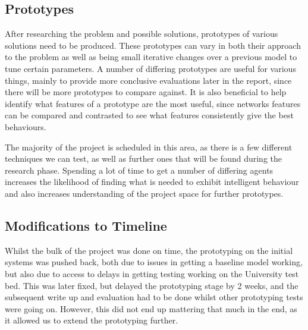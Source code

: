 \subsection{Prototypes}

After researching the problem and possible solutions, prototypes of various
solutions need to be produced. These prototypes can vary in both their approach
to the problem as well as being small iterative changes over a previous model
to tune certain parameters. A number of differing prototypes are useful for
various things, mainly to provide more conclusive evaluations later in the report,
since there will be more prototypes to compare against. It is also beneficial to
help identify what features of a prototype are the most useful, since networks
features can be compared and contrasted to see what features consistently give the
best behaviours.

The majority of the project is scheduled in this area, as there is a few
different techniques we can test, as well as further ones that will be found
during the research phase. Spending a lot of time to get a number of differing
agents increases the likelihood of finding what is needed to exhibit intelligent
behaviour and also increases understanding of the project space for further
prototypes.

\subsection{Modifications to Timeline}

Whilst the bulk of the project was done on time, the prototyping on the initial
systems was pushed back, both due to issues in getting a baseline model working,
but also due to access to delays in getting testing working on the University
test bed. This was later fixed, but delayed the prototyping stage by 2 weeks,
and the subsequent write up and evaluation had to be done whilst other
prototyping tests were going on. However, this did not end up mattering that
much in the end, as it allowed us to extend the prototyping further.
